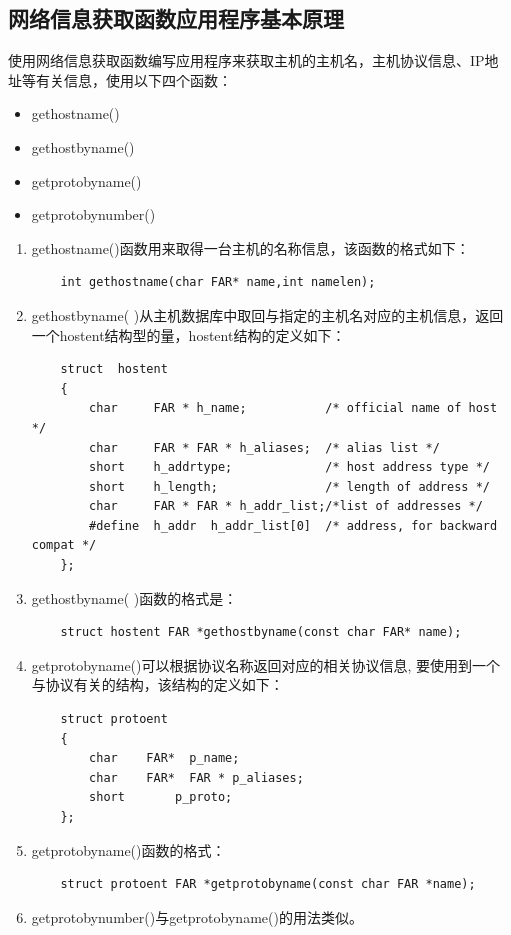 \documentclass[a4paper]{ctexrep}
\begin{document}
\begin{spacing}{1.5}
\subsection{网络信息获取函数应用程序基本原理}
使用网络信息获取函数编写应用程序来获取主机的主机名，主机协议信息、IP地址等有关信息，使用以下四个函数：
\begin{itemize}
	\item gethostname()
	\item gethostbyname()
	\item getprotobyname()
	\item getprotobynumber()
\end{itemize}
 \begin{enumerate}
 	\item gethostname()函数用来取得一台主机的名称信息，该函数的格式如下：
 	\begin{lstlisting}
 	int gethostname(char FAR* name,int namelen);
 	\end{lstlisting}
 	\item gethostbyname( )从主机数据库中取回与指定的主机名对应的主机信息，返回一个hostent结构型的量，hostent结构的定义如下：
 	\begin{lstlisting}
 	struct  hostent
 	{
 		char  	 FAR * h_name;           /* official name of host */
 		char  	 FAR * FAR * h_aliases;  /* alias list */
 		short 	 h_addrtype;             /* host address type */
 		short    h_length;               /* length of address */
 		char  	 FAR * FAR * h_addr_list;/*list of addresses */
 		#define	 h_addr  h_addr_list[0]  /* address, for backward compat */
 	};
 	\end{lstlisting}
 	\item gethostbyname( )函数的格式是：
 	\begin{lstlisting}
 	struct hostent FAR *gethostbyname(const char FAR* name);
 	\end{lstlisting}
 	\item getprotobyname()可以根据协议名称返回对应的相关协议信息, 要使用到一个与协议有关的结构，该结构的定义如下：
 	\begin{lstlisting}
 	struct protoent
 	{
 		char	FAR*  p_name;
 		char	FAR*  FAR * p_aliases;
 		short       p_proto;
 	};
 	\end{lstlisting}
 	\item getprotobyname()函数的格式：
 	\begin{lstlisting}
 	struct protoent FAR *getprotobyname(const char FAR *name);
 	\end{lstlisting}
 	\item getprotobynumber()与getprotobyname()的用法类似。
 \end{enumerate}


\end{spacing}
\end{document}
